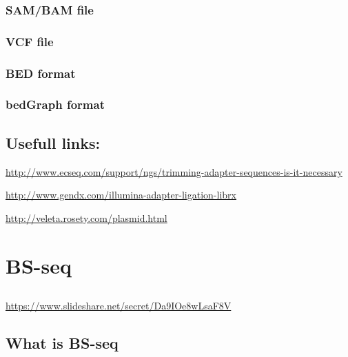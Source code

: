 \documentclass[]{book}
\begin{document}
\hypertarget{sambam-file}{%
\subsection{SAM/BAM file}\label{sambam-file}}

\hypertarget{vcf-file}{%
\subsection{VCF file}\label{vcf-file}}

\hypertarget{bed-format}{%
\subsection{BED format}\label{bed-format}}

\hypertarget{bedgraph-format}{%
\subsection{bedGraph format}\label{bedgraph-format}}

\hypertarget{usefull-links}{%
\section{Usefull links:}\label{usefull-links}}

\url{http://www.ecseq.com/support/ngs/trimming-adapter-sequences-is-it-necessary}

\url{http://www.gendx.com/illumina-adapter-ligation-librx}

\url{http://veleta.rosety.com/plasmid.html}

\hypertarget{bs-seq}{%
\chapter{BS-seq}\label{bs-seq}}

\hypertarget{section-3}{%
\section{}\label{section-3}}

\url{https://www.slideshare.net/secret/Da9IOe8wLsaF8V}

\hypertarget{what-is-bs-seq}{%
\section{What is BS-seq}\label{what-is-bs-seq}}

\hypertarget{section-4}{%
\section{}\label{section-4}}
\end{document}
